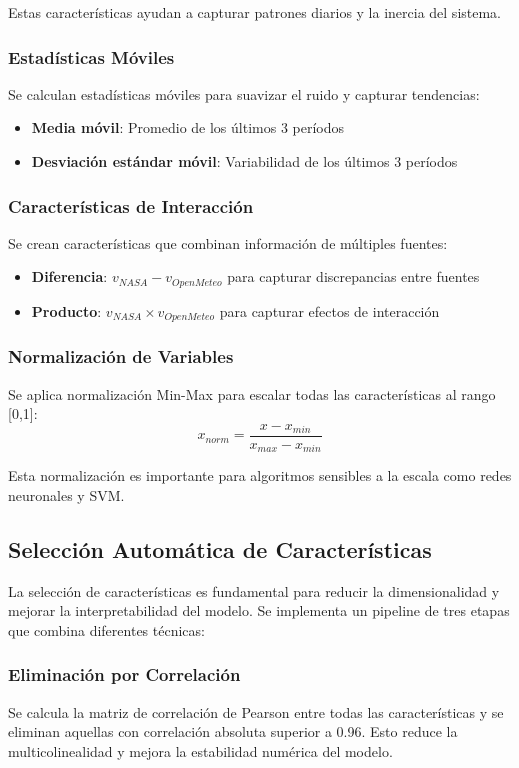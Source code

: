 \documentclass[conference]{IEEEtran}
\begin{document}
	Estas características ayudan a capturar patrones diarios y la inercia del sistema.
	
	\subsubsection{Estadísticas Móviles}
	Se calculan estadísticas móviles para suavizar el ruido y capturar tendencias:
	\begin{itemize}
		\item \textbf{Media móvil}: Promedio de los últimos 3 períodos
		\item \textbf{Desviación estándar móvil}: Variabilidad de los últimos 3 períodos
	\end{itemize}
	
	\subsubsection{Características de Interacción}
	Se crean características que combinan información de múltiples fuentes:
	\begin{itemize}
		\item \textbf{Diferencia}: $v_{NASA} - v_{OpenMeteo}$ para capturar discrepancias entre fuentes
		\item \textbf{Producto}: $v_{NASA} \times v_{OpenMeteo}$ para capturar efectos de interacción
	\end{itemize}
	
	\subsubsection{Normalización de Variables}
	Se aplica normalización Min-Max para escalar todas las características al rango [0,1]:
	\begin{equation}
		x_{norm} = \frac{x - x_{min}}{x_{max} - x_{min}}
	\end{equation}
	
	Esta normalización es importante para algoritmos sensibles a la escala como redes neuronales y SVM.
	
	\subsection{Selección Automática de Características}
	La selección de características es fundamental para reducir la dimensionalidad y mejorar la interpretabilidad del modelo. Se implementa un pipeline de tres etapas que combina diferentes técnicas:
	
	\subsubsection{Eliminación por Correlación}
	Se calcula la matriz de correlación de Pearson entre todas las características y se eliminan aquellas con correlación absoluta superior a 0.96. Esto reduce la multicolinealidad y mejora la estabilidad numérica del modelo.
	
\end{document}
